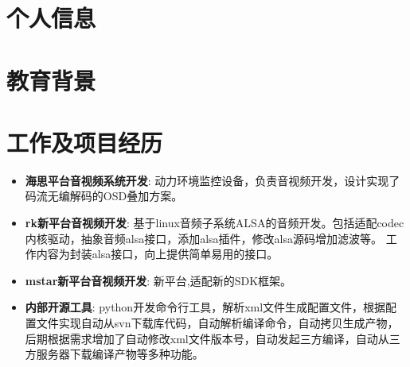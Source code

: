 \documentclass{resume}
\begin{document}


\section{个人信息}
 
\section{教育背景}

\section{工作及项目经历}

\begin{itemize}[parsep=0.2ex]
  \item \textbf{海思平台音视频系统开发}: \newline
    动力环境监控设备，负责音视频开发，设计实现了码流无编解码的OSD叠加方案。
  \item \textbf{rk新平台音视频开发}: \newline
    基于linux音频子系统ALSA的音频开发。包括适配codec内核驱动，抽象音频alsa接口，添加alsa插件，修改alsa源码增加滤波等。
    工作内容为封装alsa接口，向上提供简单易用的接口。
  \item \textbf{mstar新平台音视频开发}:\newline
    新平台,适配新的SDK框架。
  \item \textbf{内部开源工具}:\newline
    python开发命令行工具，解析xml文件生成配置文件，根据配置文件实现自动从svn下载库代码，自动解析编译命令，自动拷贝生成产物，
    后期根据需求增加了自动修改xml文件版本号，自动发起三方编译，自动从三方服务器下载编译产物等多种功能。
\end{itemize}
\end{document}
